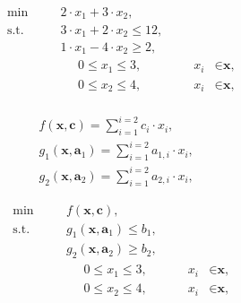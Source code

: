 \begin{figure}[!htbp]
	\null\hfill
	\begin{subfigure}[b]{0.3\textwidth}
		\begin{subequations}
			\begin{alignat*}{4}
			& \text{min} & & 2 \cdot x_{1} + 3 \cdot x_{2}\textrm{,} &&&\\
			& \text{s.t.} & \quad & 3 \cdot x_{1} + 2 \cdot x_{2} \leqslant 12\textrm{,} &&&\\
			& & \quad & 1 \cdot x_{1} - 4 \cdot x_{2} \geqslant 2\textrm{,} &&&\\
			& & & \phantom{\sum} 0 \leqslant x_{1} \leqslant 3, &\quad & x_{i} &\in \textbf{x}\textrm{,} \\
			& & & \phantom{\sum} 0 \leqslant x_{2} \leqslant 4, &\quad & x_{i} &\in \textbf{x}\textrm{,} \\
			\end{alignat*}
		\end{subequations}
		\caption{}
		\label{fig:lpexample:a}
	\end{subfigure}
	\hfill
	\begin{subfigure}[b]{0.3\textwidth}
		\begin{gather*}
		f \left( \textbf{x}, \textbf{c} \right) = \sum_{i=1}^{i=2} c_{i} \cdot x_{i}\textrm{,}\\
		g_{1} \left( \textbf{x}, \textbf{a}_{1} \right) = \sum_{i=1}^{i=2} a_{1,i} \cdot x_{i}\textrm{,}\\
		g_{2} \left( \textbf{x}, \textbf{a}_{2} \right) = \sum_{i=1}^{i=2} a_{2,i} \cdot x_{i}\textrm{,}
		\end{gather*}
		\caption{}
		\label{fig:lpexample:b}
	\end{subfigure}
	\hfill
	\begin{subfigure}[b]{0.3\textwidth}
		\begin{subequations}
			\begin{alignat*}{4}
			& \text{min} & & f \left( \textbf{x}, \textbf{c} \right)\textrm{,} &&&\\
			& \text{s.t.} & \quad & g_{1} \left( \textbf{x}, \textbf{a}_{1} \right) \leqslant b_{1}\textrm{,} &&&\\
			& & \quad & g_{2} \left( \textbf{x}, \textbf{a}_{2} \right) \geqslant b_{2}\textrm{,} &&&\\
			& & & \phantom{\sum} 0 \leqslant x_{1} \leqslant 3, &\quad & x_{i} &\in \textbf{x}\textrm{,} \\
			& & & \phantom{\sum} 0 \leqslant x_{2} \leqslant 4, &\quad & x_{i} &\in \textbf{x}\textrm{,} \\

\end{alignat*}
\end{subequations}
\end{subfigure}
\end{figure}
